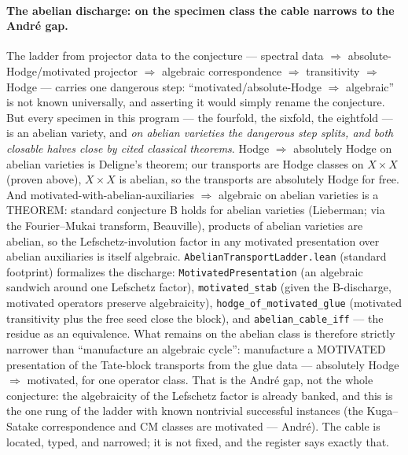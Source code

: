 \documentclass[11pt]{article}
\theoremstyle{definition}
\theoremstyle{remark}
\begin{document}
\paragraph{The abelian discharge: on the specimen class the cable
narrows to the Andr\'e gap.}  The ladder from projector data to the
conjecture --- spectral data $\Rightarrow$ absolute-Hodge/motivated
projector $\Rightarrow$ algebraic correspondence $\Rightarrow$
transitivity $\Rightarrow$ Hodge --- carries one dangerous step:
``motivated/absolute-Hodge $\Rightarrow$ algebraic'' is not known
universally, and asserting it would simply rename the conjecture.  But
every specimen in this program --- the fourfold, the sixfold, the
eightfold --- is an abelian variety, and \emph{on abelian varieties
the dangerous step splits, and both closable halves close by cited
classical theorems}.  Hodge $\Rightarrow$ absolutely Hodge on abelian
varieties is Deligne's theorem; our transports are Hodge classes on
$X\times X$ (proven above), $X\times X$ is abelian, so the transports
are absolutely Hodge for free.  And motivated-with-abelian-auxiliaries
$\Rightarrow$ algebraic on abelian varieties is a THEOREM: standard
conjecture B holds for abelian varieties (Lieberman; via the
Fourier--Mukai transform, Beauville), products of abelian varieties
are abelian, so the Lefschetz-involution factor in any motivated
presentation over abelian auxiliaries is itself algebraic.
\texttt{AbelianTransportLadder.lean} (standard footprint) formalizes
the discharge: \texttt{MotivatedPresentation} (an algebraic sandwich
around one Lefschetz factor), \texttt{motivated\_stab} (given the
B-discharge, motivated operators preserve algebraicity),
\texttt{hodge\_of\_motivated\_glue} (motivated transitivity plus the
free seed close the block), and \texttt{abelian\_cable\_iff} --- the
residue as an equivalence.  What remains on the abelian class is
therefore strictly narrower than ``manufacture an algebraic cycle'':
manufacture a MOTIVATED presentation of the Tate-block transports from
the glue data --- absolutely Hodge $\Rightarrow$ motivated, for one
operator class.  That is the Andr\'e gap, not the whole conjecture:
the algebraicity of the Lefschetz factor is already banked, and this
is the one rung of the ladder with known nontrivial successful
instances (the Kuga--Satake correspondence and CM classes are
motivated --- Andr\'e).  The cable is located, typed, and narrowed;
it is not fixed, and the register says exactly that.
\end{document}
